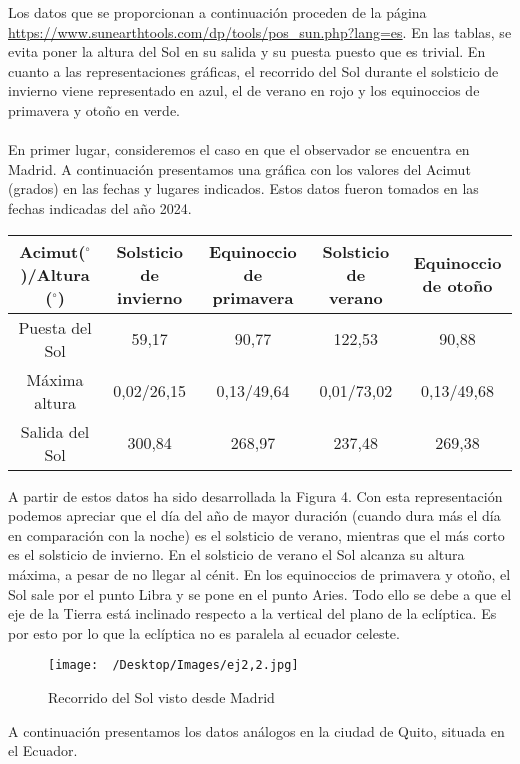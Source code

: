\documentclass{article}
\begin{document}
\begin{sol}
	Los datos que se proporcionan a continuación proceden de la página \url{https://www.sunearthtools.com/dp/tools/pos_sun.php?lang=es}. En las tablas, se evita poner la altura del Sol en su salida y su puesta puesto que es trivial. En cuanto a las representaciones gráficas, el recorrido del Sol durante el solsticio de invierno viene representado en azul, el de verano en rojo y los equinoccios de primavera y otoño en verde. \\ \\
En primer lugar, consideremos el caso en que el observador se encuentra en Madrid. A continuación presentamos una gráfica con los valores del Acimut (grados) en las fechas y lugares indicados. Estos datos fueron tomados en las fechas indicadas del año 2024.
	\begin{center}
	\begin{tabular}{|c|c|c|c|c|}
		\hline 
		Acimut($\displaystyle ^{\circ} $)/Altura ($\displaystyle ^{\circ} $) & Solsticio de invierno & Equinoccio de primavera & Solsticio de verano & Equinoccio de otoño \\
\hline
		Puesta del Sol & 59,17 & 90,77 & 122,53 & 90,88 \\
		\hline
		Máxima altura & 0,02/26,15 & 0,13/49,64 & 0,01/73,02 & 0,13/49,68\\
		\hline
		Salida del Sol & 300,84& 268,97 & 237,48& 269,38\\
		\hline
	\end{tabular}
	\end{center}
A partir de estos datos ha sido desarrollada la Figura 4. Con esta representación podemos apreciar que el día del año de mayor duración (cuando dura más el día en comparación con la noche) es el solsticio de verano, mientras que el más corto es el solsticio de invierno. En el solsticio de verano el Sol alcanza su altura máxima, a pesar de no llegar al cénit. En los equinoccios de primavera y otoño, el Sol sale por el punto Libra y se pone en el punto Aries. Todo ello se debe a que el eje de la Tierra está inclinado respecto a la vertical del plano de la eclíptica. Es por esto por lo que la eclíptica no es paralela al ecuador celeste.
\begin{figure}
\centering
\texttt{[image: ~/Desktop/Images/ej2,2.jpg]}
\caption{Recorrido del Sol visto desde Madrid}
\label{}
\end{figure}
A continuación presentamos los datos análogos en la ciudad de Quito, situada en el Ecuador.
\begin{center}

\end{center}
\end{sol}
\end{document}
